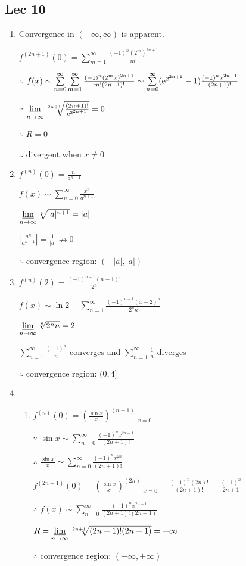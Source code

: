 \subsection{Lec 10}
    \begin{enumerate}[1]
    \item
    Convergence in $(-\infty,\infty)$ is apparent.
    \par $f^{(2n+1)}(0)=\sum\limits_{m=1}^{\infty} \frac{(-1)^n(2^m)^{2n+1}}{m!}$
    \par $\therefore$ $f(x)\sim\sum\limits_{n=0}^{\infty} \sum\limits_{m=1}^{\infty} \frac{(-1)^n(2^mx)^{2n+1}}{m!(2n+1)!}\sim\sum\limits_{n=0}^{\infty} (\mathrm{e}^{2^{2n+1}}-1)\frac{(-1)^n x^{2n+1}}{(2n+1)!}$
    \par $\because$ $\varliminf\limits_{n\rightarrow{\infty}} \sqrt[2n+1]{\frac{(2n+1)!}{\mathrm{e}^{2^{2n+1}}}}=0$
    \par $\therefore$ $R=0$
    \par $\therefore$ divergent when $x\neq 0$
    
    \item
    $f^{(n)}(0)=\frac{n!}{a^{n+1}}$
    \par $f(x)\sim\sum\limits_{n=0}^{\infty} \frac{x^n}{a^{n+1}}$
    \par $\varliminf\limits_{n\rightarrow{\infty}}\sqrt[n]{|a|^{n+1}}=|a|$
    \par $|\frac{a^n}{a^{n+1}}|=\frac{1}{|a|}\nrightarrow0$
    \par $\therefore$ convergence region: $(-|a|,|a|)$
    
    \item
    $f^{(n)}(2)=\frac{(-1)^{n-1}(n-1)!}{2^n}$
    \par $f(x)\sim  \ln 2+\sum\limits_{n=1}^{\infty} \frac{(-1)^{n-1}(x-2)^n}{2^nn}$
    \par $\varliminf\limits_{n\rightarrow{\infty}}\sqrt[n]{2^nn}=2$
    \par $\sum\limits_{n=1}^\infty \frac{(-1)^n}{n}$ converges and $\sum\limits_{n=1}^\infty \frac{1}{n}$ diverges
    \par $\therefore$ convergence region: $(0,4]$
    
    \item
        \begin{enumerate}[(1)]
        \item
        $f^{(n)}(0)=(\frac{\sin x}{x})^{(n-1)}\big|_{x=0}$
        \par $\because$ $\sin x\sim \sum\limits_{n=0}^\infty \frac{(-1)^nx^{2n+1}}{(2n+1)!}$
        \par $\therefore$ $\frac{\sin x}{x}\sim \sum\limits_{n=0}^\infty \frac{(-1)^nx^{2n}}{(2n+1)!}$
        \par $f^{(2n+1)}(0)=(\frac{\sin x}{x})^{(2n)}\big|_{x=0}=\frac{(-1)^n(2n)!}{(2n+1)!}=\frac{(-1)^n}{2n+1}$
        \par $\therefore$ $f(x)\sim \sum\limits_{n=0}^\infty \frac{(-1)^nx^{2n+1}}{(2n+1)!(2n+1)}$
        \par $R=\varliminf\limits_{n\rightarrow{\infty}} \sqrt[2n+1]{(2n+1)!(2n+1)}=+\infty$
        \par $\therefore$ convergence region: $(-\infty,+\infty)$
        

\end{enumerate}
\end{enumerate}
